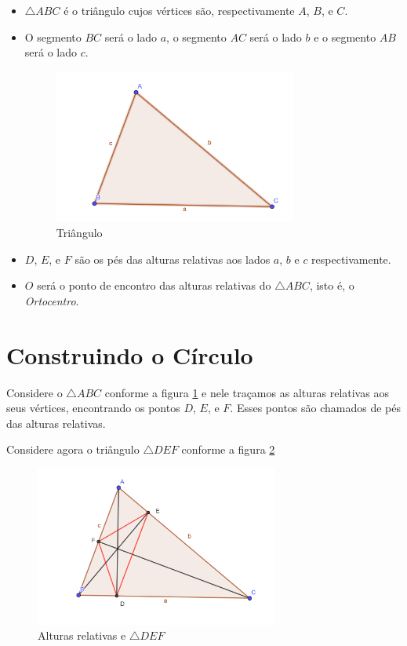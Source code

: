 \documentclass[12pt, openright, a4paper, brazil, openany, oneside]{abntex2}
\begin{document}
\begin{itemize}
\item $\triangle ABC$ é o triângulo cujos vértices são, respectivamente $A$, $B$, e $C$.
\item O segmento $BC$ será o lado $a$, o segmento $AC$ será o lado $b$ e o segmento $AB$ será o lado $c$.

\begin{figure}[h]

    \center

    \includegraphics[width=8cm]{triangulo1.png}
    \caption{Triângulo \label{tria1}}
    
\end{figure}

\item $D$, $E$, e $F$ são os pés das alturas relativas aos lados $a$, $b$ e $c$ respectivamente.

\item $O$ será o ponto de encontro das alturas relativas do $\triangle ABC$, isto é, o \textit{Ortocentro}.

\end{itemize} 


\section{Construindo o Círculo}

Considere o $\triangle ABC$ conforme a figura \ref{tria1} e nele traçamos as alturas relativas aos seus vértices, encontrando os pontos $D$, $E$, e $F$. Esses pontos são chamados de pés das alturas relativas.

\newpage

Considere agora o triângulo $\triangle DEF$ conforme a figura \ref{tria2} 

\begin{figure}[h]

    \center

    \includegraphics[width=8cm]{triangulo2.png}
    \caption{Alturas relativas e $\triangle DEF$ \label{tria2}}
    
\end{figure}
\end{document}
